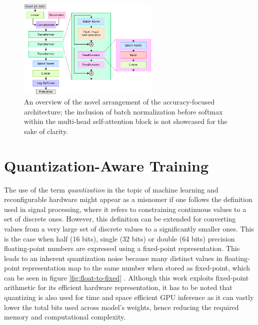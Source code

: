 \begin{figure}[hpt!]
  \centering
  \includegraphics[trim={0cm 0cm 0cm 0cm}, width=0.6\textwidth, center]{models/constituent_net_accuracy.pdf}
  \caption{An overview of the novel arrangement of the accuracy-focused architecture; the inclusion of batch normalization before softmax within the multi-head self-attention block is not showcased for the sake of clarity.}
  \label{fig:constituent-net-accuracy}
\end{figure}


\section{Quantization-Aware Training}\label{pre-training-quantization}
The use of the term \textit{quantization} in the topic of machine learning and reconfigurable hardware might appear as a misnomer if one follows the definition used in signal processing, where it refers to constraining continuous values to a set of discrete ones. However, this definition can be extended for converting values from a very large set of discrete values to a 
significantly smaller ones. This is the case when half (16 bits), single (32 bits) or double (64 bits) precision floating-point numbers are expressed using a fixed-point representation. This leads to an inherent quantization noise because many distinct values in floating-point representation map to the same number when stored as fixed-point, which can be seen in figure \ref{fig:float-to-fixed} \cite{76-shaumontfixed}. Although this work exploits fixed-point arithmetic for its efficient hardware representation, it has to be noted that quantizing is also used for time and space efficient GPU inference as it can vastly lower the total bits used across model's weights, hence reducing the required memory and computational complexity.

